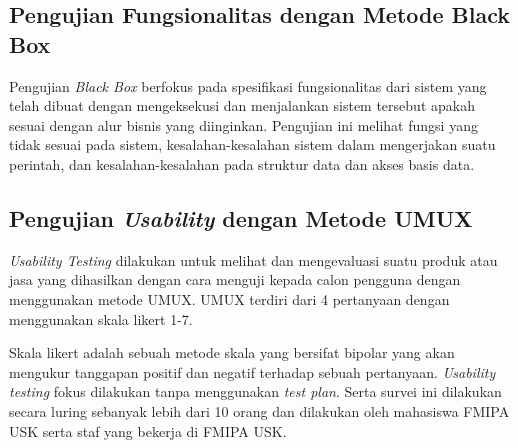 \subsection{Pengujian Fungsionalitas dengan Metode Black Box}
\par Pengujian \textit{Black Box} berfokus pada spesifikasi fungsionalitas dari sistem yang telah dibuat dengan mengeksekusi dan menjalankan sistem tersebut apakah sesuai dengan alur bisnis yang diinginkan. Pengujian ini melihat fungsi yang tidak sesuai pada sistem, kesalahan-kesalahan sistem dalam mengerjakan suatu perintah, dan kesalahan-kesalahan pada struktur data dan akses basis data.

\subsection{Pengujian \textit{Usability} dengan Metode UMUX}
\par \textit{Usability Testing} dilakukan untuk melihat dan mengevaluasi suatu produk atau jasa yang dihasilkan dengan cara menguji kepada calon pengguna dengan menggunakan metode UMUX. UMUX terdiri dari 4 pertanyaan dengan menggunakan skala likert 1-7.
\par Skala likert adalah sebuah metode skala yang bersifat bipolar yang akan mengukur tanggapan positif dan negatif terhadap sebuah pertanyaan. \textit{Usability testing} fokus dilakukan tanpa menggunakan \textit{test plan}. Serta survei ini dilakukan secara luring sebanyak lebih dari 10 orang dan dilakukan oleh mahasiswa FMIPA USK serta staf yang bekerja di FMIPA USK.




